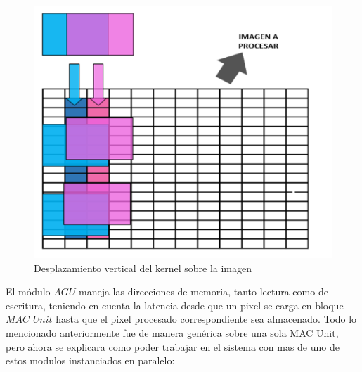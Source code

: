 \begin{figure}
\centering
\includegraphics[scale=0.7]{conv1_despl.png}
\caption{Desplazamiento vertical del kernel sobre la imagen }
\label{verticaldesp}
\end{figure}

El módulo $AGU$ maneja las direcciones de memoria, tanto lectura como de escritura, teniendo en cuenta la latencia desde que un pixel se carga en bloque $MAC$ $Unit$ hasta que el pixel procesado correspondiente sea almacenado.
Todo lo mencionado anteriormente fue de manera genérica sobre una sola MAC Unit, pero ahora se explicara como poder trabajar en el sistema con mas de uno de estos modulos instanciados en paralelo:

